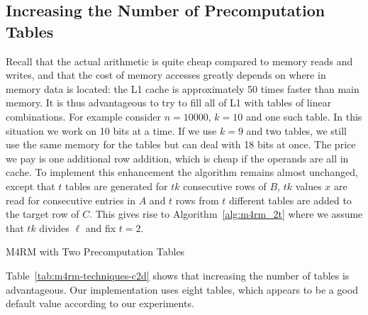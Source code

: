 \subsection{Increasing the Number of Precomputation Tables}
Recall that the actual arithmetic is quite cheap compared to memory  reads and writes, and that the cost of memory accesses greatly depends on where in memory data is located: the L1 cache is approximately 50 times faster than main memory. It is thus advantageous to try to fill all of L1 with tables of linear combinations. For example consider $n = 10000$, $k=10$ and one such table. In this situation we work on 10 bits at a time. If we use $k=9$ and two tables, we still use the same memory for the tables but can deal with 18 bits at once. The price we pay is one additional row addition, which is cheap if the operands are all in cache. To implement this enhancement the algorithm remains almost unchanged, except that $t$ tables are generated for $tk$ consecutive rows of $B$, $tk$ values $x$ are read for consecutive entries in $A$ and $t$ rows from $t$ different tables are added to the target row of $C$. This gives rise to Algorithm~\ref{alg:m4rm_2t} where we assume that $tk$ divides $\ell$ and fix $t=2$.

\begin{algorithm}[H]

\caption{\textsc{M4RM} with Two Precomputation Tables}
\label{alg:m4rm_2t}
\end{algorithm}

Table~\ref{tab:m4rm-techniques-c2d} shows that increasing the number of tables is advantageous. Our implementation uses eight tables, which appears to be a good default value according to our experiments.

